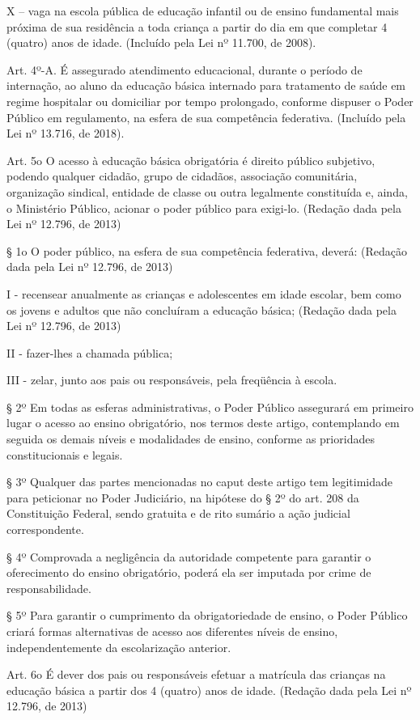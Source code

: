 \documentclass[
]{book}
\begin{document}
X -- vaga na escola pública de educação infantil ou de ensino fundamental mais próxima de sua residência a toda criança a partir do dia em que completar 4 (quatro) anos de idade. (Incluído pela Lei nº 11.700, de 2008).

Art. 4º-A. É assegurado atendimento educacional, durante o período de internação, ao aluno da educação básica internado para tratamento de saúde em regime hospitalar ou domiciliar por tempo prolongado, conforme dispuser o Poder Público em regulamento, na esfera de sua competência federativa. (Incluído pela Lei nº 13.716, de 2018).

Art. 5o O acesso à educação básica obrigatória é direito público subjetivo, podendo qualquer cidadão, grupo de cidadãos, associação comunitária, organização sindical, entidade de classe ou outra legalmente constituída e, ainda, o Ministério Público, acionar o poder público para exigi-lo. (Redação dada pela Lei nº 12.796, de 2013)

§ 1o O poder público, na esfera de sua competência federativa, deverá: (Redação dada pela Lei nº 12.796, de 2013)

I - recensear anualmente as crianças e adolescentes em idade escolar, bem como os jovens e adultos que não concluíram a educação básica; (Redação dada pela Lei nº 12.796, de 2013)

II - fazer-lhes a chamada pública;

III - zelar, junto aos pais ou responsáveis, pela freqüência à escola.

§ 2º Em todas as esferas administrativas, o Poder Público assegurará em primeiro lugar o acesso ao ensino obrigatório, nos termos deste artigo, contemplando em seguida os demais níveis e modalidades de ensino, conforme as prioridades constitucionais e legais.

§ 3º Qualquer das partes mencionadas no caput deste artigo tem legitimidade para peticionar no Poder Judiciário, na hipótese do § 2º do art. 208 da Constituição Federal, sendo gratuita e de rito sumário a ação judicial correspondente.

§ 4º Comprovada a negligência da autoridade competente para garantir o oferecimento do ensino obrigatório, poderá ela ser imputada por crime de responsabilidade.

§ 5º Para garantir o cumprimento da obrigatoriedade de ensino, o Poder Público criará formas alternativas de acesso aos diferentes níveis de ensino, independentemente da escolarização anterior.

Art. 6o É dever dos pais ou responsáveis efetuar a matrícula das crianças na educação básica a partir dos 4 (quatro) anos de idade. (Redação dada pela Lei nº 12.796, de 2013)
\end{document}
